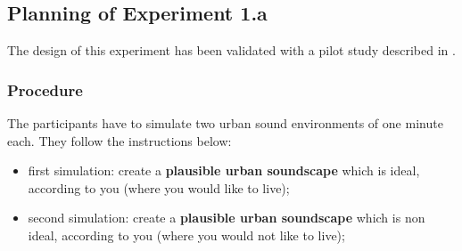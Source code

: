 \documentclass[preprint,12pt]{elsarticle}
\begin{document}
\subsection{Planning of Experiment 1.a}
\label{sec:xp1a_plan}

The design of this experiment has been validated with a pilot study described in \cite{lafay2014new}.

\subsubsection*{Procedure}

%
%
%
%
%

The participants have to simulate two urban sound environments of one minute each. They follow the instructions below:
\begin{itemize}
\item  first simulation: create a \textbf{plausible urban soundscape} which is ideal, according to you (where you would like to live);
\item second simulation: create a \textbf{plausible urban soundscape} which is non ideal, according to you (where you would not like to live);
\end{itemize}
\end{document}
